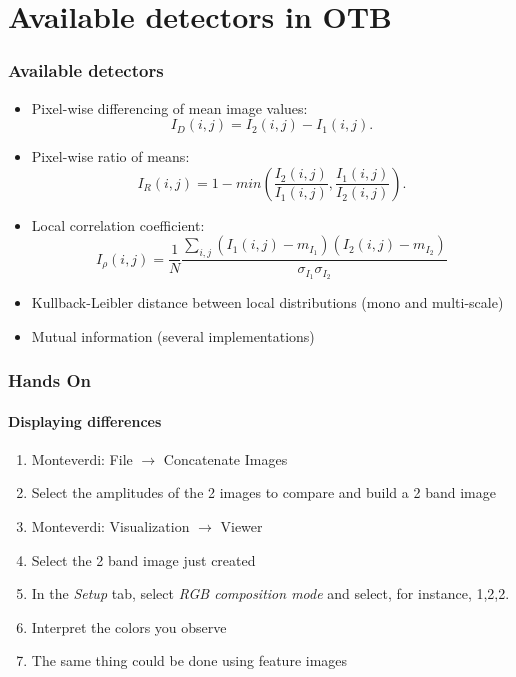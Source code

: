 \documentclass[compress]{beamer}
\begin{document}
\section[Detectors]{Available detectors in OTB}
\begin{frame}
  \frametitle{Available detectors}
  \small
  \begin{itemize}
    \item Pixel-wise differencing of mean image values: 
      \begin{equation}
	I_{D}(i,j)=I_{2}(i,j)-I_{1}(i,j).
      \end{equation}
    \item Pixel-wise ratio of means:
      \begin{equation}
\displaystyle I_{R}(i,j) = 1 - min \left(\frac{\displaystyle I_{2}(i,j)}{\displaystyle I_{1}(i,j)},\frac{\displaystyle I_{1}(i,j)}{\displaystyle I_{2}(i,j)}\right).
\end{equation}
      \item Local correlation coefficient:
\begin{equation}
  I_\rho(i,j) = \frac{1}{N}\frac{\sum_{i,j}(I_1(i,j)-m_{I_1})(I_2(i,j)-m_{I_2})}{\sigma_{I_1}
\sigma_{I_2}}
\end{equation}
\item Kullback-Leibler distance between local distributions (mono and
  multi-scale)
  \item Mutual information (several implementations)
  \end{itemize}
  \normalsize
\end{frame}

\begin{frame}
  \frametitle{Hands On}
  \framesubtitle{Displaying differences}
  \begin{enumerate}
  \item Monteverdi: File $\rightarrow$ Concatenate Images
  \item Select the amplitudes of the 2 images to compare and build a 2
    band image
  \item Monteverdi: Visualization $\rightarrow$ Viewer
  \item Select the 2 band image just created
  \item In the {\em Setup} tab, select {\em RGB composition mode} and
    select, for instance, 1,2,2.
  \item Interpret the colors you observe
  \item The same thing could be done using feature images
  \end{enumerate}
\end{frame}
\end{document}
